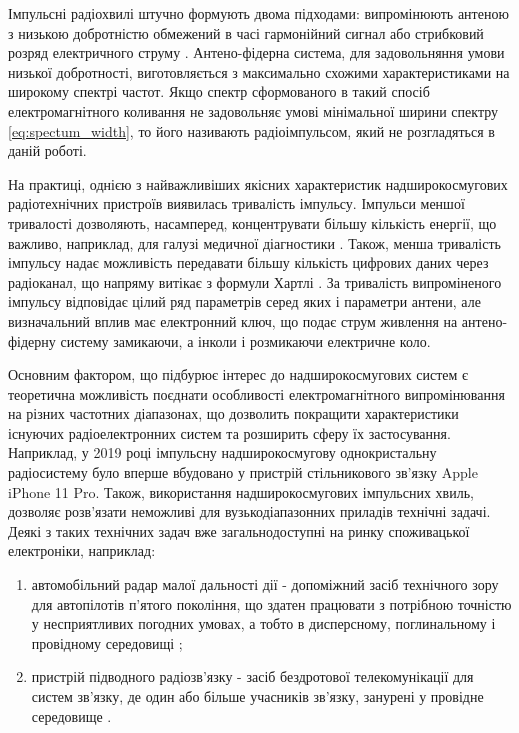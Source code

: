 Імпульсні радіохвилі штучно формують двома підходами: випромінюють антеною 
з низькою добротністю обмежений в часі гармонійний сигнал 
\cite{imp:Mesyas1963, imp:Mesyas1974} або стрибковий розряд електричного 
струму \cite{imp:BaumMN053}. Антено-фідерна система, для задовольняння 
умови низької добротності, виготовляється з максимально схожими 
характеристиками на широкому спектрі частот. Якщо спектр сформованого в 
такий спосіб електромагнітного коливання не задовольняє умові 
мінімальної ширини спектру \eqref{eq:spectum_width}, то його називають 
радіоімпульсом, який не розгладяться в даній роботі.

На практиці, однією з найважливіших якісних характеристик надширокосмугових
радіотехнічних пристроїв виявилась тривалість імпульсу. Імпульси меншої 
тривалості дозволяють, насамперед, концентрувати більшу кількість енергії,
що важливо, наприклад, для галузі медичної діагностики 
\cite{imp:Guardiola2010}. Також, менша тривалість імпульсу надає 
можливість передавати більшу кількість цифрових даних через радіоканал, що 
напряму витікає з формули Хартлі \cite{imp:Taub1986}. За тривалість 
випроміненого імпульсу відповідає цілий ряд параметрів серед яких і 
параметри антени, але визначальний вплив має електронний ключ, що подає 
струм живлення на антено-фідерну систему замикаючи, а інколи і розмикаючи 
електричне коло.


Основним фактором, що підбурює інтерес до надширокосмугових систем є 
теоретична можливість поєднати особливості електромагнітного випромінювання 
на різних частотних діапазонах, що дозволить покращити характеристики 
існуючих радіоелектронних систем та розширить сферу їх застосування.
Наприклад, у 2019 році імпульсну надширокосмугову однокристальну 
радіосистему було вперше вбудовано у пристрій стільникового зв'язку 
Apple iPhone 11 Pro. Також, використання надширокосмугових імпульсних 
хвиль, дозволяє розв'язати неможливі для вузькодіапазонних приладів 
технічні задачі. Деякі з таких технічних задач вже загальнодоступні на
ринку споживацької електроніки, наприклад:

\begin{enumerate}

\item автомобільний радар малої дальності дії - допоміжний засіб 
технічного зору для автопілотів п'ятого покоління, що здатен працювати 
з потрібною точністю у несприятливих погодних умовах, а тобто в 
дисперсному, поглинальному і провідному середовищі \cite{imp:Yarovoy2017};

\item пристрій підводного радіозв'язку - засіб бездротової 
телекомунікації для систем зв'язку, де один або більше учасників 
зв'язку, занурені у провідне середовище \cite{imp:Garcia2009, 
imp:Karagianni2015}.

\end{enumerate}

